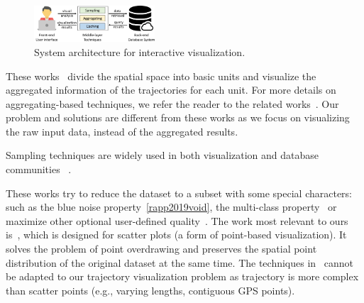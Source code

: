 \begin{figure}
	\centering
	\includegraphics[width=0.40\textwidth]{pictures/framework/framework.pdf}
	\vspace{-2mm}
	\caption{System architecture for interactive visualization.} \label{fig:framework}
    \vspace{-2mm}
\end{figure}


These works~\cite{wood2010visualisation,guo2009flow,von2015mobilitygraphs} divide the {spatial space} into basic units and visualize the aggregated information of the trajectories for each unit. For more details on aggregating-based techniques, we refer the reader to the related works~\cite{andrienko2008spatio,adrienko2010spatial}. Our problem and solutions are different from these works as we focus on visualizing the raw input data, instead of the aggregated results.






Sampling techniques are widely used in both visualization and database communities ~\cite{battle2013dynamic,rapp2019void,chen2014visual,yu2020turbocharging,park2016visualization,qin2020making,DBLP:conf/sigmod/DingHCC016,DBLP:journals/pvldb/KimBPIMR15}.

These works try to reduce the dataset to a subset with some special characters: such as the blue noise property~\ref{rapp2019void}, the multi-class property~\cite{chen2014visual} or maximize other optional user-defined quality~\cite{yu2020turbocharging}. 
The work most relevant to ours is~\cite{park2016visualization}, which is designed for scatter plots (a form of point-based visualization). It solves the problem of point overdrawing and preserves the spatial point distribution of the original dataset at the same time. The techniques in~\cite{park2016visualization} cannot be adapted to our trajectory visualization problem
as trajectory is more complex than scatter points (e.g., varying lengths, contiguous GPS points).


